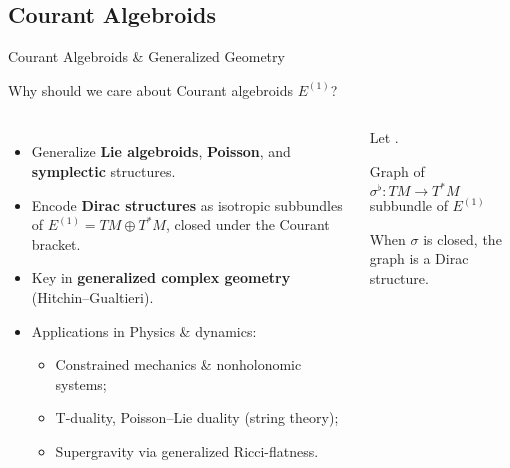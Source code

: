 \documentclass[beamer,10pt,handout]{standalone}  \Handouttrue
\begin{document}
\subsection{Courant Algebroids}
\begin{frame}{Courant Algebroids \& Generalized Geometry}
   \begin{block}{Why should we care about Courant algebroids $E^{(1)}$?}	
	
\begin{columns}

    \begin{itemize}
      \item[\ding{43}] Generalize \textbf{Lie algebroids}, \textbf{Poisson}, and \textbf{symplectic} structures.
      
      \item[\ding{72}] Encode \textbf{Dirac structures} as isotropic subbundles of $E^{(1)}= TM \oplus T^*M $, closed under the Courant bracket.
      
      \item[\ding{42}] Key in \textbf{generalized  complex geometry} (Hitchin–Gualtieri).
      
      \item[\ding{118}] Applications in Physics \& dynamics:
      \begin{itemize}
        \item Constrained mechanics \& nonholonomic systems;
        \item T-duality, Poisson–Lie duality (string theory);                         
        \item Supergravity via generalized Ricci-flatness.
      \end{itemize}
    \end{itemize}

  \begin{exblock}
	Let \color{blue}{$\sigma \in \Omega^2$}.
	\medskip

	\color{black}Graph of \color{blue}$ \sigma^\flat: TM \to T^*M$ \color{black} subbundle of $E^{(1)}$

	\medskip
    
	\medskip

	When $\sigma$ is closed, the graph is a Dirac structure.

  \end{exblock}
\end{columns}
\end{block}
\end{frame}
\end{document}
